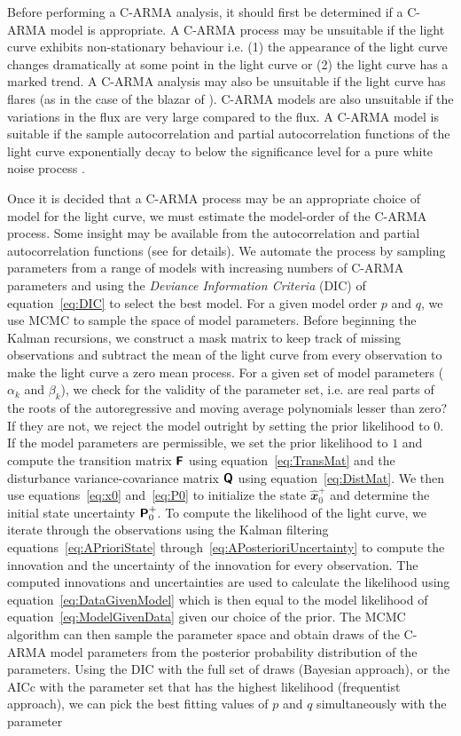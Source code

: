 \documentclass[a4paper,fleqn,usenatbib]{mnras}
\begin{document}
Before performing a C-ARMA analysis, it should first be determined if a C-ARMA model is appropriate. A C-ARMA process may be unsuitable if the light curve exhibits non-stationary behaviour i.e. (1) the appearance of the light curve changes dramatically at some point in the light curve or (2) the light curve has a marked trend. A C-ARMA analysis may also be unsuitable if the light curve has flares (as in the case of the blazar of \citealp{Edelson13}). C-ARMA models are also unsuitable if the variations in the flux are very large compared to the flux. A C-ARMA model is suitable if the sample autocorrelation and partial autocorrelation functions of the light curve exponentially decay to below the significance level for a pure white noise process \citep{BrockwellDavisITSF}. 

Once it is decided that a C-ARMA process may be an appropriate choice of model for the light curve, we must estimate the model-order of the C-ARMA process. Some insight may be available from the autocorrelation and partial autocorrelation functions (see \citealp{BrockwellDavisITSF} for details). We automate the process by sampling parameters from a range of models with increasing numbers of C-ARMA parameters and using the \textit{Deviance Information Criteria} (DIC) of equation~\eqref{eq:DIC} to select the best model. For a given model order $p$ and $q$, we use MCMC to sample the space of model parameters. Before beginning the Kalman recursions, we construct a mask matrix to keep track of missing observations and subtract the mean of the light curve from every observation to make the light curve a zero mean process. For a given set of model parameters ($\alpha_{k}$ and $\beta_{k}$), we check for the validity of the parameter set, i.e. are real parts of the roots of the autoregressive and moving average polynomials lesser than zero? If they are not, we reject the model outright by setting the prior likelihood to $0$. If the model parameters are permissible, we set the prior likelihood to $1$ and compute the transition matrix $\textbf{\textsf{F}}$ using equation~\eqref{eq:TransMat} and the disturbance variance-covariance matrix $\textbf{\textsf{Q}}$ using equation~\eqref{eq:DistMat}. We then use equations~\eqref{eq:x0} and~\eqref{eq:P0} to initialize the state $\widehat{\mathbfit{x}}^{+}_{0}$ and determine the initial state uncertainty $\textbf{\textsf{P}}^{+}_{0}$. To compute the likelihood of the light curve, we iterate through the observations using the Kalman filtering equations~\eqref{eq:APrioriState} through~\eqref{eq:APosterioriUncertainty} to compute the innovation and the uncertainty of the innovation for every observation. The computed innovations and uncertainties are used to calculate the likelihood using equation~\eqref{eq:DataGivenModel} which is then equal to the model likelihood of equation~\eqref{eq:ModelGivenData} given our choice of the prior. The MCMC algorithm can then sample the parameter space and obtain draws of the C-ARMA model parameters from the posterior probability distribution of the parameters. Using the DIC with the full set of draws (Bayesian approach), or the AICc with the parameter set that has the highest likelihood (frequentist approach), we can pick the best fitting values of $p$ and $q$ simultaneously with the parameter 
\end{document}
